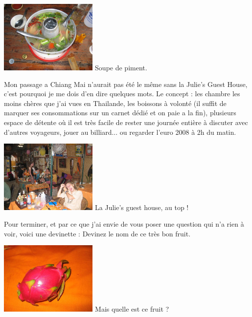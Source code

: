\begin{multicols}{2}
\hspace*{-0.65cm}
\includegraphics[width=4.8cm]{articles/Chiang-mai/1214286184dsFU.jpg}
Soupe de piment.

Mon passage a Chiang Mai n'aurait pas été le même sans la Julie's Guest House, c'est pourquoi je me dois d'en dire quelques mots. Le concept : les chambre les moins chères que j'ai vues en Thailande, les boissons à volonté (il suffit de marquer ses consommations sur un carnet dédié et on paie a la fin), plusieurs espace de détente où il est très facile de rester une journée entière à discuter avec d'autres voyageurs, jouer au billiard... ou regarder l'euro 2008 à 2h du matin.

\hspace*{-0.65cm}
\includegraphics[width=4.8cm]{articles/Chiang-mai/1214471834JD3r.jpg}
La Julie's guest house, au top !

Pour terminer, et par ce que j'ai envie de vous poser une question qui n'a rien à voir, voici une devinette : Devinez le nom de ce très bon fruit.

\hspace*{-0.65cm}
\includegraphics[width=4.8cm]{articles/Chiang-mai/1214471825EGhM.jpg}
Mais quelle est ce fruit ?

\end{multicols}


